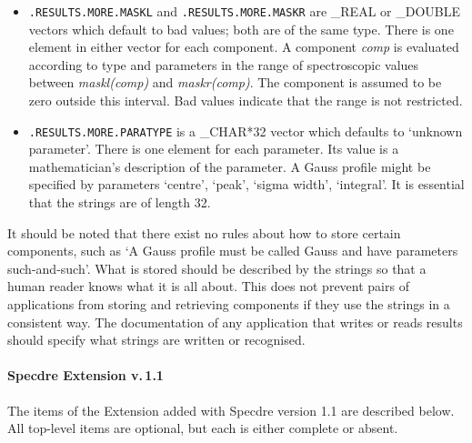 \documentclass[11pt,twoside]{article}
\begin{document}
\begin{itemize}
\item{\tt .RESULTS.MORE.MASKL} and {\tt .RESULTS.MORE.MASKR} are \_REAL
   or \_DOUBLE vectors which default to bad values; both are of the same
   type. There is one element in either vector for each component. A
   component {\it comp} is evaluated according to type and parameters in
   the range of spectroscopic values between {\it maskl(comp)} and {\it
   maskr(comp)}. The component is assumed to be zero outside this
   interval. Bad values indicate that the range is not restricted.

\item{\tt .RESULTS.MORE.PARATYPE} is a \_CHAR*32 vector which defaults
   to `unknown parameter'.  There is one element for each parameter.
   Its value is a mathematician's description of the parameter. A Gauss
   profile might be specified by parameters `centre', `peak', `sigma
   width', `integral'. It is essential that the strings are of length 32.
\end{itemize}

   It should be noted that there exist no rules about how to store
   certain components, such as `A Gauss profile must be called Gauss and
   have parameters such-and-such'. What is stored should be described
   by the strings so that a human reader knows what it is all about.
   This does not prevent pairs of applications from storing and
   retrieving components if they use the strings in a consistent
   way. The documentation of any application that writes or reads
   results should specify what strings are written or recognised.


\paragraph{Specdre Extension v.\,1.1}

   The items of the Extension added with Specdre version 1.1 are
   described below. All top-level items are optional, but each is either
   complete or absent.
\end{document}
